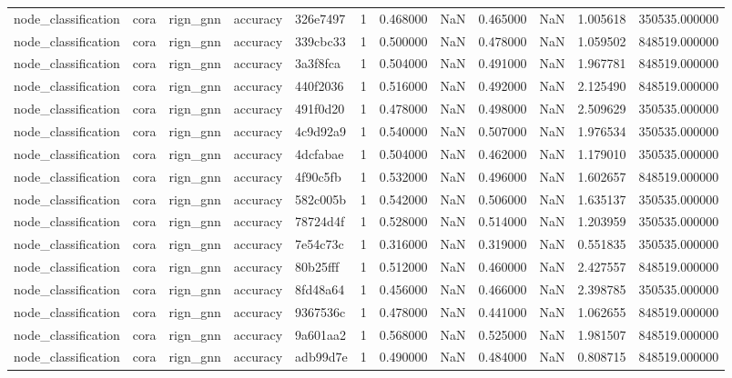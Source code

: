 \begin{tabular}{lllllrrrrrrr}
node_classification & cora & rign_gnn & accuracy & 326e7497 & 1 & 0.468000 & NaN & 0.465000 & NaN & 1.005618 & 350535.000000 \\
node_classification & cora & rign_gnn & accuracy & 339cbc33 & 1 & 0.500000 & NaN & 0.478000 & NaN & 1.059502 & 848519.000000 \\
node_classification & cora & rign_gnn & accuracy & 3a3f8fca & 1 & 0.504000 & NaN & 0.491000 & NaN & 1.967781 & 848519.000000 \\
node_classification & cora & rign_gnn & accuracy & 440f2036 & 1 & 0.516000 & NaN & 0.492000 & NaN & 2.125490 & 848519.000000 \\
node_classification & cora & rign_gnn & accuracy & 491f0d20 & 1 & 0.478000 & NaN & 0.498000 & NaN & 2.509629 & 350535.000000 \\
node_classification & cora & rign_gnn & accuracy & 4c9d92a9 & 1 & 0.540000 & NaN & 0.507000 & NaN & 1.976534 & 350535.000000 \\
node_classification & cora & rign_gnn & accuracy & 4dcfabae & 1 & 0.504000 & NaN & 0.462000 & NaN & 1.179010 & 350535.000000 \\
node_classification & cora & rign_gnn & accuracy & 4f90c5fb & 1 & 0.532000 & NaN & 0.496000 & NaN & 1.602657 & 848519.000000 \\
node_classification & cora & rign_gnn & accuracy & 582c005b & 1 & 0.542000 & NaN & 0.506000 & NaN & 1.635137 & 350535.000000 \\
node_classification & cora & rign_gnn & accuracy & 78724d4f & 1 & 0.528000 & NaN & 0.514000 & NaN & 1.203959 & 350535.000000 \\
node_classification & cora & rign_gnn & accuracy & 7e54c73c & 1 & 0.316000 & NaN & 0.319000 & NaN & 0.551835 & 350535.000000 \\
node_classification & cora & rign_gnn & accuracy & 80b25fff & 1 & 0.512000 & NaN & 0.460000 & NaN & 2.427557 & 848519.000000 \\
node_classification & cora & rign_gnn & accuracy & 8fd48a64 & 1 & 0.456000 & NaN & 0.466000 & NaN & 2.398785 & 350535.000000 \\
node_classification & cora & rign_gnn & accuracy & 9367536c & 1 & 0.478000 & NaN & 0.441000 & NaN & 1.062655 & 848519.000000 \\
node_classification & cora & rign_gnn & accuracy & 9a601aa2 & 1 & 0.568000 & NaN & 0.525000 & NaN & 1.981507 & 848519.000000 \\
node_classification & cora & rign_gnn & accuracy & adb99d7e & 1 & 0.490000 & NaN & 0.484000 & NaN & 0.808715 & 848519.000000 \\

\end{tabular}
